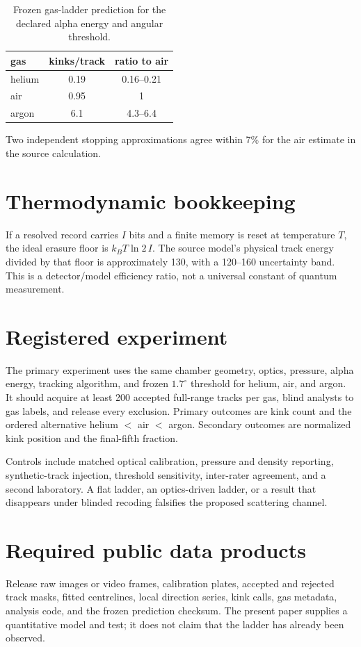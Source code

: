 \documentclass[11pt,a4paper]{article}
\begin{document}
\begin{table}[H]\centering
\caption{Frozen gas-ladder prediction for the declared alpha energy and angular threshold.}
\begin{tabular}{lcc}
\toprule
gas&kinks/track&ratio to air\\\midrule
helium&0.19&0.16--0.21\\
air&0.95&1\\
argon&6.1&4.3--6.4\\
\bottomrule
\end{tabular}
\end{table}
Two independent stopping approximations agree within 7\% for the air estimate in the source calculation.

\section{Thermodynamic bookkeeping}
If a resolved record carries $I$ bits and a finite memory is reset at temperature $T$, the ideal erasure floor is $k_BT\ln2\,I$. The source model's physical track energy divided by that floor is approximately 130, with a 120--160 uncertainty band. This is a detector/model efficiency ratio, not a universal constant of quantum measurement.

\section{Registered experiment}
The primary experiment uses the same chamber geometry, optics, pressure, alpha energy, tracking algorithm, and frozen $1.7^\circ$ threshold for helium, air, and argon. It should acquire at least 200 accepted full-range tracks per gas, blind analysts to gas labels, and release every exclusion. Primary outcomes are kink count and the ordered alternative helium $<$ air $<$ argon. Secondary outcomes are normalized kink position and the final-fifth fraction.

Controls include matched optical calibration, pressure and density reporting, synthetic-track injection, threshold sensitivity, inter-rater agreement, and a second laboratory. A flat ladder, an optics-driven ladder, or a result that disappears under blinded recoding falsifies the proposed scattering channel.

\section{Required public data products}
Release raw images or video frames, calibration plates, accepted and rejected track masks, fitted centrelines, local direction series, kink calls, gas metadata, analysis code, and the frozen prediction checksum. The present paper supplies a quantitative model and test; it does not claim that the ladder has already been observed.
\end{document}
